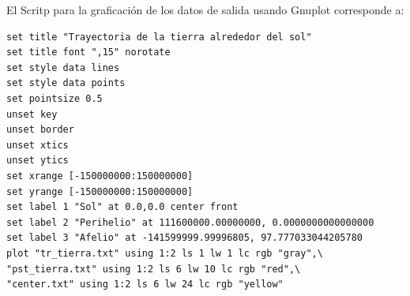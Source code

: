 \documentclass[12pt,a4paper,twoside]{article}
\begin{document}
El Scritp para la graficación de los datos de salida usando Gnuplot corresponde a:
\begin{verbatim}
set title "Trayectoria de la tierra alrededor del sol"
set title font ",15" norotate
set style data lines
set style data points
set pointsize 0.5
unset key
unset border
unset xtics
unset ytics
set xrange [-150000000:150000000]
set yrange [-150000000:150000000]
set label 1 "Sol" at 0.0,0.0 center front
set label 2 "Perihelio" at 111600000.00000000, 0.0000000000000000
set label 3 "Afelio" at -141599999.99996805, 97.777033044205780
plot "tr_tierra.txt" using 1:2 ls 1 lw 1 lc rgb "gray",\
"pst_tierra.txt" using 1:2 ls 6 lw 10 lc rgb "red",\
"center.txt" using 1:2 ls 6 lw 24 lc rgb "yellow"
\end{verbatim}
\end{document}
